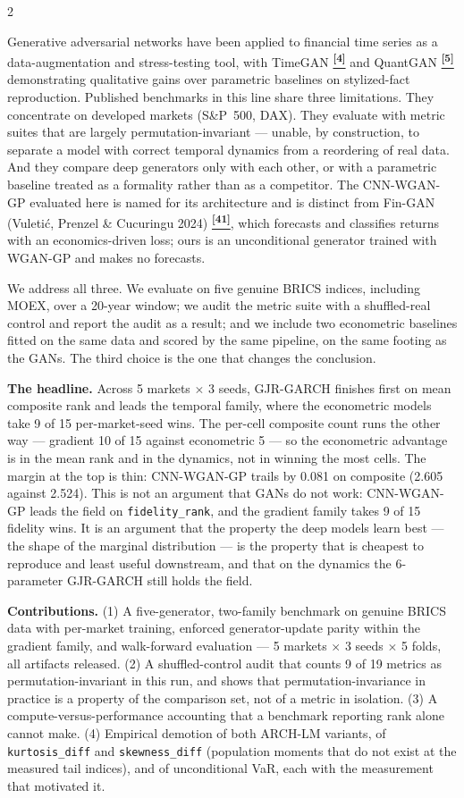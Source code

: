 \documentclass[10pt]{article}
\newcommand{\tcite}[1]{%
  \hyperlink{R:#1}{\textsuperscript{\scriptsize\textbf{[#1]}}}}
\begin{document}
\begin{multicols}{2}

\small
Generative adversarial networks have been applied to financial time series as a data-augmentation and stress-testing tool, with TimeGAN\tcite{4} and QuantGAN\tcite{5} demonstrating qualitative gains over parametric baselines on stylized-fact reproduction. Published benchmarks in this line share three limitations. They concentrate on developed markets (S\&P~500, DAX). They evaluate with metric suites that are largely permutation-invariant --- unable, by construction, to separate a model with correct temporal dynamics from a reordering of real data. And they compare deep generators only with each other, or with a parametric baseline treated as a formality rather than as a competitor. The CNN-WGAN-GP evaluated here is named for its architecture and is distinct from Fin-GAN (Vuleti\'{c}, Prenzel \& Cucuringu 2024)\tcite{41}, which forecasts and classifies returns with an economics-driven loss; ours is an unconditional generator trained with WGAN-GP and makes no forecasts.

We address all three. We evaluate on five genuine BRICS indices, including MOEX, over a 20-year window; we audit the metric suite with a shuffled-real control and report the audit as a result; and we include two econometric baselines fitted on the same data and scored by the same pipeline, on the same footing as the GANs. The third choice is the one that changes the conclusion.

\textbf{The headline.} Across 5 markets $\times$ 3 seeds, GJR-GARCH finishes first on mean composite rank and leads the temporal family, where the econometric models take 9 of 15 per-market-seed wins. The per-cell composite count runs the other way --- gradient 10 of 15 against econometric 5 --- so the econometric advantage is in the mean rank and in the dynamics, not in winning the most cells. The margin at the top is thin: CNN-WGAN-GP trails by 0.081 on composite (2.605 against 2.524). This is not an argument that GANs do not work: CNN-WGAN-GP leads the field on \texttt{fidelity\_rank}, and the gradient family takes 9 of 15 fidelity wins. It is an argument that the property the deep models learn best --- the shape of the marginal distribution --- is the property that is cheapest to reproduce and least useful downstream, and that on the dynamics the 6-parameter GJR-GARCH still holds the field.

\textbf{Contributions.} (1) A five-generator, two-family benchmark on genuine BRICS data with per-market training, enforced generator-update parity within the gradient family, and walk-forward evaluation --- 5 markets $\times$ 3 seeds $\times$ 5 folds, all artifacts released. (2) A shuffled-control audit that counts 9 of 19 metrics as permutation-invariant in this run, and shows that permutation-invariance in practice is a property of the comparison set, not of a metric in isolation. (3) A compute-versus-performance accounting that a benchmark reporting rank alone cannot make. (4) Empirical demotion of both ARCH-LM variants, of \texttt{kurtosis\_diff} and \texttt{skewness\_diff} (population moments that do not exist at the measured tail indices), and of unconditional VaR, each with the measurement that motivated it.


\end{multicols}
\end{document}
